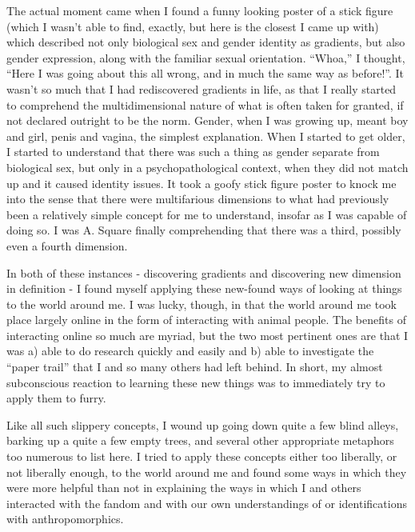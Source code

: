 The actual moment came when I found a funny looking poster of a stick figure (which I wasn't able to find, exactly, but here is the closest I came up with) which described not only biological sex and gender identity as gradients, but also gender expression, along with the familiar sexual orientation. ``Whoa,'' I thought, ``Here I was going about this all wrong, and in much the same way as before!''. It wasn't so much that I had rediscovered gradients in life, as that I really started to comprehend the multidimensional nature of what is often taken for granted, if not declared outright to be the norm. Gender, when I was growing up, meant boy and girl, penis and vagina, the simplest explanation. When I started to get older, I started to understand that there was such a thing as gender separate from biological sex, but only in a psychopathological context, when they did not match up and it caused identity issues. It took a goofy stick figure poster to knock me into the sense that there were multifarious dimensions to what had previously been a relatively simple concept for me to understand, insofar as I was capable of doing so. I was A. Square finally comprehending that there was a third, possibly even a fourth dimension.

In both of these instances - discovering gradients and discovering new dimension in definition - I found myself applying these new-found ways of looking at things to the world around me. I was lucky, though, in that the world around me took place largely online in the form of interacting with animal people. The benefits of interacting online so much are myriad, but the two most pertinent ones are that I was a) able to do research quickly and easily and b) able to investigate the ``paper trail'' that I and so many others had left behind. In short, my almost subconscious reaction to learning these new things was to immediately try to apply them to furry.

Like all such slippery concepts, I wound up going down quite a few blind alleys, barking up a quite a few empty trees, and several other appropriate metaphors too numerous to list here. I tried to apply these concepts either too liberally, or not liberally enough, to the world around me and found some ways in which they were more helpful than not in explaining the ways in which I and others interacted with the fandom and with our own understandings of or identifications with anthropomorphics.

